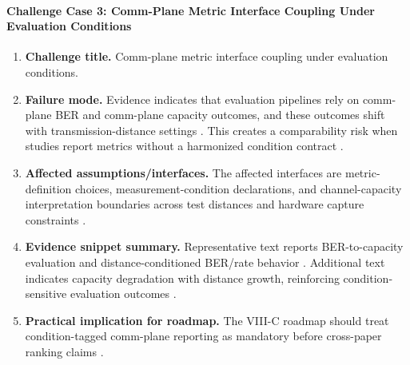 \paragraph{Challenge Case 3: Comm-Plane Metric Interface Coupling Under Evaluation Conditions}
\begin{enumerate}
    \item \textbf{Challenge title.} Comm-plane metric interface coupling under evaluation conditions.
    \item \textbf{Failure mode.} Evidence indicates that evaluation pipelines rely on comm-plane BER and comm-plane capacity outcomes, and these outcomes shift with transmission-distance settings \cite{O_ISAC_381}. This creates a comparability risk when studies report metrics without a harmonized condition contract \cite{O_ISAC_381}.
    \item \textbf{Affected assumptions/interfaces.} The affected interfaces are metric-definition choices, measurement-condition declarations, and channel-capacity interpretation boundaries across test distances and hardware capture constraints \cite{O_ISAC_381}.
    \item \textbf{Evidence snippet summary.} Representative text reports BER-to-capacity evaluation and distance-conditioned BER/rate behavior \cite{O_ISAC_381}. Additional text indicates capacity degradation with distance growth, reinforcing condition-sensitive evaluation outcomes \cite{O_ISAC_381}.
    \item \textbf{Practical implication for roadmap.} The VIII-C roadmap should treat condition-tagged comm-plane reporting as mandatory before cross-paper ranking claims \cite{O_ISAC_381}.
\end{enumerate}

